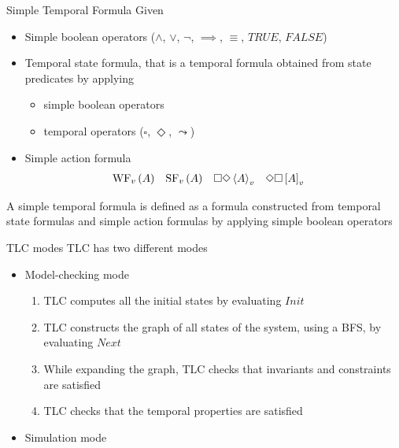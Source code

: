 \begin{frame}{Simple Temporal Formula}
    Given
    \begin{itemize}
        \item Simple boolean operators ($\land$, $\lor$, $\neg$, $\implies$, $\equiv$, $TRUE$, $FALSE$)
        \item Temporal state formula, that is a temporal formula obtained from state predicates by applying
        \begin{itemize}
            \item simple boolean operators
            \item temporal operators ($\square$, $\Diamond$, $\leadsto$)
        \end{itemize}
        \item Simple action formula\begin{align*}
            \textrm{WF}_v \left( A \right) &&
            \textrm{SF}_v \left( A \right) &&
            \square \Diamond \left< A \right>_v &&
            \Diamond \square \left[ A \right]_v &&
        \end{align*}
    \end{itemize}
    A simple temporal formula is defined as a formula constructed from temporal state formulas and simple action formulas by applying simple boolean operators
\end{frame}

\begin{frame}{TLC modes}
    TLC has two different modes
    \begin{itemize}
        \item<1,3> Model-checking mode
         {
            \begin{enumerate}
                \item TLC computes all the initial states by evaluating $Init$
                \item TLC constructs the graph of all states of the system, using a BFS, by evaluating $Next$
                \item While expanding the graph, TLC checks that invariants and constraints are satisfied
                \item TLC checks that the temporal properties are satisfied
            \end{enumerate}
        }
        \item<2-> Simulation mode
    \end{itemize}
\end{frame}